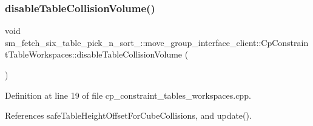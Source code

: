 \subsubsection{\texorpdfstring{disable\+Table\+Collision\+Volume()}{disableTableCollisionVolume()}}
{\footnotesize\ttfamily void sm\+\_\+fetch\+\_\+six\+\_\+table\+\_\+pick\+\_\+n\+\_\+sort\+\_\+::move\+\_\+group\+\_\+interface\+\_\+client\+::\+Cp\+Constraint\+Table\+Workspaces\+::disable\+Table\+Collision\+Volume (\begin{DoxyParamCaption}{ }\end{DoxyParamCaption})}



Definition at line 19 of file cp\+\_\+constraint\+\_\+tables\+\_\+workspaces.\+cpp.



References safe\+Table\+Height\+Offset\+For\+Cube\+Collisions, and update().


